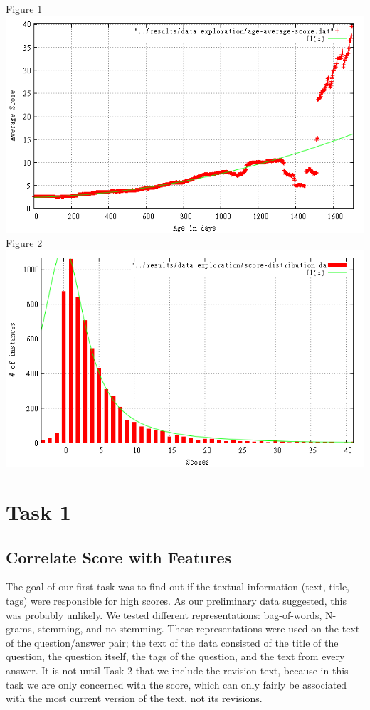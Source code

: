 \documentclass[11pt, oneside]{article}   	%
\begin{document}
\centering 
Figure 1
\includegraphics[width=\textwidth]{age-average-score}
Figure 2
\includegraphics[width=\textwidth]{score-instances.png}
\raggedright

\section{Task 1}
\subsection{Correlate Score with Features}
The goal of our first task was to find out if the textual information (text, title, tags) were responsible for high scores. As our preliminary data suggested, this was probably unlikely.  We tested different representations: bag-of-words, N-grams, stemming, and no stemming. These representations were used on the text of the question/answer pair; the text of the data consisted of the title of the question, the question itself, the tags of the question, and the text from every answer. It is not until Task 2 that we include the revision text, because in this task we are only concerned with the score, which can only fairly be associated with the most current version of the text, not its revisions. 
\end{document}
